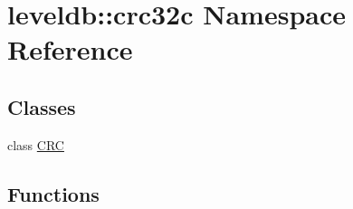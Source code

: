 \hypertarget{namespaceleveldb_1_1crc32c}{}\section{leveldb\+:\+:crc32c Namespace Reference}
\label{namespaceleveldb_1_1crc32c}
\subsection*{Classes}
\begin{DoxyCompactItemize}
\item 
class \hyperlink{classleveldb_1_1crc32c_1_1_c_r_c}{C\+R\+C}
\end{DoxyCompactItemize}
\subsection*{Functions}
